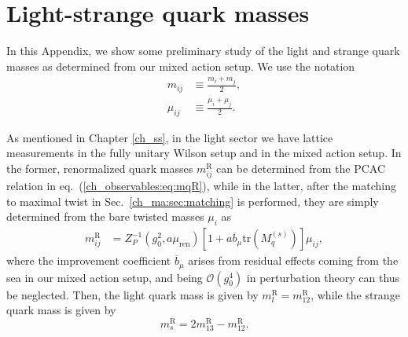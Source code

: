 
\chapter{Light-strange quark masses}
\label{apex_light_qm}

In this Appendix, we show some preliminary study of the light and strange quark masses as determined from our mixed action setup. We use the notation
\begin{align}
m_{ij}&\equiv\frac{m_i+m_j}{2}, \\
\mu_{ij}&\equiv\frac{\mu_i+\mu_j}{2}.
\end{align}

As mentioned in Chapter \ref{ch_ss}, in the light sector we have lattice measurements in the fully unitary Wilson setup and in the mixed action setup. In the former, renormalized quark masses $m_{ij}^{\textrm{R}}$ can be determined from the PCAC relation in eq.~(\ref{ch_observables:eq:mqR}), while in the latter, after the matching to maximal twist in Sec.~\ref{ch_ma:sec:matching} is performed, they are simply determined from the bare twisted masses $\mu_i$ as
\begin{align}
m_{ij}^{\textrm{R}}&=Z_P^{-1}(g_0^2,a\mu_{\textrm{ren}})\left[1+a\overline{b}_\mu\textrm{tr}\left(M_q^{(s)}\right)\right]\mu_{ij},
\end{align}
where the improvement coefficient $\overline{b}_{\mu}$ arises from residual effects coming from the sea in our mixed action setup, and being $\mathcal{O}(g_0^4)$ in perturbation theory can thus be neglected. Then, the light quark mass is given by $m_{l}^{\textrm{R}}=m_{12}^{\textrm{R}}$, while the strange quark mass is given by
\begin{equation}
m_s^{\textrm{R}}=2m_{13}^{\textrm{R}}-m_{12}^{\textrm{R}}.
\end{equation}

